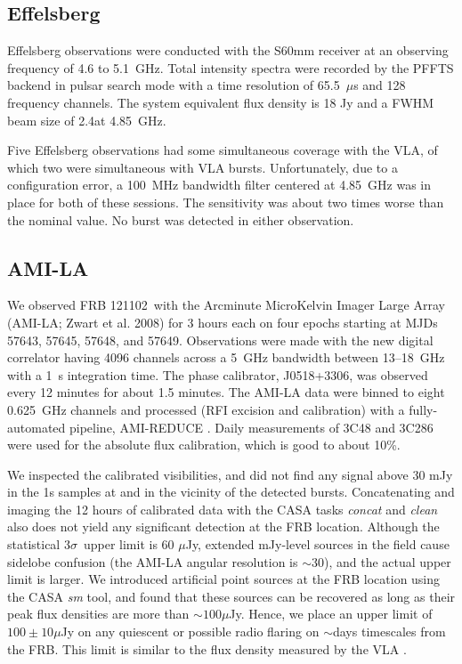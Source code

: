 \documentclass[twocolumn]{aastex61}
\newcommand{\frb}{FRB 121102}
\begin{document}
\subsection{Effelsberg}

Effelsberg observations were conducted with the S60mm receiver at an observing frequency of 4.6 to 5.1~GHz. Total intensity spectra were recorded by the PFFTS backend in pulsar search mode with a time resolution of 65.5~$\mu$s and 128 frequency channels. The system equivalent flux density is 18 Jy and a FWHM beam size of 2.4\arcmin at 4.85~GHz. 

Five Effelsberg observations had some simultaneous coverage with the VLA, of which two were simultaneous with VLA bursts. Unfortunately, due to a configuration error, a 100~MHz bandwidth filter centered at 4.85~GHz was in place for both of these sessions. The sensitivity was about two times worse than the nominal value. No burst was detected in either observation.

\subsection{AMI-LA}

We observed \frb\ with the Arcminute MicroKelvin Imager Large Array (AMI-LA; Zwart et al. 2008) for 3 hours each on four epochs starting at MJDs 57643, 57645, 57648, and 57649. Observations were made with the new digital correlator having 4096 channels across a 5~GHz bandwidth between 13--18~GHz with a 1~s integration time. The phase calibrator, J0518+3306, was observed every 12 minutes for about 1.5 minutes. The AMI-LA data were binned to eight 0.625~GHz channels and processed (RFI excision and calibration) with a fully-automated pipeline, AMI-REDUCE \citep[e.g.,][]{2013MNRAS.429.3330P}. Daily measurements of 3C48 and 3C286 were used for the absolute flux calibration, which is good to about 10\%. 

We inspected the calibrated visibilities, and did not find any signal above 30 mJy in the 1s samples at and in the vicinity of the detected bursts. Concatenating and imaging the 12 hours of calibrated data with the CASA tasks {\it concat} and {\it clean} also does not yield any significant detection at the FRB location. Although the statistical $3\sigma$\ upper limit is 60 $\mu$Jy, extended mJy-level sources in the field cause sidelobe confusion (the AMI-LA angular resolution is $\sim$30\arcsec), and the actual upper limit is larger. We introduced artificial point sources at the FRB location using the CASA {\it sm} tool, and found that these sources can be recovered as long as their peak flux densities are more than $\sim100\mu$Jy. Hence, we place an upper limit of $100\pm10 \mu$Jy on any quiescent or possible radio flaring on $\sim$days timescales from the FRB. This limit is similar to the flux density measured by the VLA \citep{LOC}.
\end{document}

